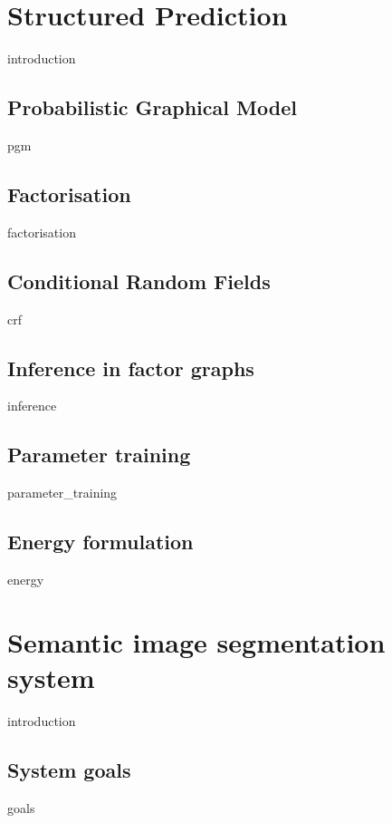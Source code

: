 \documentclass[12pt]{report}
\begin{document}
\chapter{Structured Prediction}
    \label{chapter:structured_prediction}
    {introduction}
    
    \section{Probabilistic Graphical Model}
    {pgm}
    
    \section{Factorisation}
    {factorisation}
    
    \section{Conditional Random Fields }
    {crf}
    	
    \section{Inference in factor graphs}
    \label{sec:inference}
    {inference}
    
    \section{Parameter training }
    {parameter_training}
    
    \section{Energy formulation}	
    \label{sec:energy}
    {energy}
    

\chapter{Semantic image segmentation system}
    \label{chapter:system}
    {introduction}
    
    \section{System goals}	
    {goals}
    
\end{document}
